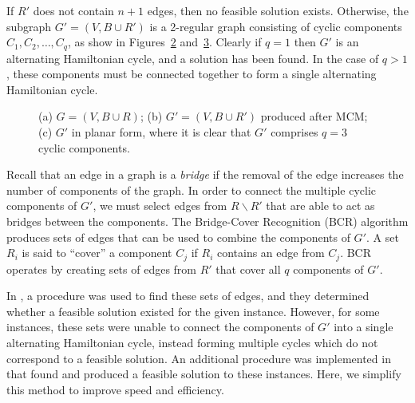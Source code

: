 \documentclass{elsarticle}
\begin{document}
If $R'$ does not contain $n+1$ edges, then no feasible solution exists. Otherwise, the subgraph $G'=(V, B \cup R')$ is a 2-regular graph consisting of cyclic components $C_1,C_2,\dotsc,C_q$, as show in Figures~\ref{fig:matching} and~\ref{fig:mps}. Clearly if $q = 1$ then $G'$ is an alternating Hamiltonian cycle, and a solution has been found. In the case of $q > 1$, these components must be connected together to form a single alternating Hamiltonian cycle.

\begin{figure}[H]	
	\centering
	\begin{subfigure}[h]{0.3\textwidth}
		
		\caption{}
		\label{fig:threshold}
	\end{subfigure} \hspace{5mm}
	\begin{subfigure}[h]{0.3\textwidth}
		
		\caption{}
		\label{fig:matching}
	\end{subfigure} \hspace{5mm}
	\begin{subfigure}[h]{0.25\textwidth}
		
		\caption{}
		\label{fig:mps}
	\end{subfigure}
	\caption{(a) $G = (V, B\cup R)$; (b) $G'=(V, B \cup R')$ produced after MCM; (c) $G'$ in planar form, where it is clear that $G'$ comprises $q = 3$ cyclic components.}
	\label{fig:mcm}
\end{figure}

\noindent Recall that an edge in a graph is a \emph{bridge} if the removal of the edge increases the number of components of the graph. In order to connect the multiple cyclic components of $G'$, we must select edges from $R \backslash R'$ that are able to act as bridges between the components. The Bridge-Cover Recognition (BCR) algorithm produces sets of edges that can be used to combine the components of $G'$. A set $R_i$ is said to ``cover'' a component $C_j$ if $R_i$ contains an edge from $C_j$. BCR operates by creating sets of edges from $R'$ that cover all $q$ components of $G'$. 

In \cite{becker2010}, a procedure was used to find these sets of edges, and they determined whether a feasible solution existed for the given instance. However, for some instances, these sets were unable to connect the components of $G'$ into a single alternating Hamiltonian cycle, instead forming multiple cycles which do not correspond to a feasible solution. An additional procedure was implemented in \cite{hawa2018} that found and produced a feasible solution to these instances. Here, we simplify this method to improve speed and efficiency.
\end{document}
